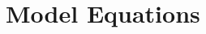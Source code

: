 \documentclass[../main]{subfiles}
\begin{document}
  \chapter{Model Equations}\label{chapter:modelequations}
\end{document}
